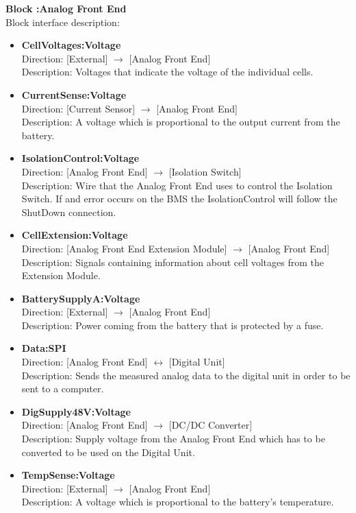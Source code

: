 \textbf{Block :Analog Front End}\\
Block interface description:
\begin{itemize}
	\item \textbf{CellVoltages:Voltage}\\
	Direction: [External] $\rightarrow$ [Analog Front End]\\
	Description: Voltages that indicate the voltage of the individual cells.
	\item \textbf{CurrentSense:Voltage}\\
	Direction: [Current Sensor] $\rightarrow$ [Analog Front End]\\
	Description: A voltage which is proportional to the output current from the battery.
	\item \textbf{IsolationControl:Voltage}\\
	Direction: [Analog Front End] $\rightarrow$ [Isolation Switch]\\
	Description: Wire that the Analog Front End uses to control the Isolation Switch. If and error occurs on the BMS the IsolationControl will follow the ShutDown connection.
	\item \textbf{CellExtension:Voltage}\\
	Direction: [Analog Front End Extension Module] $\rightarrow$ [Analog Front End]\\
	Description: Signals containing information about cell voltages from the Extension Module.
	\item \textbf{BatterySupplyA:Voltage}\\
	Direction: [External] $\rightarrow$ [Analog Front End]\\
	Description: Power coming from the battery that is protected by a fuse.
	\item \textbf{Data:SPI}\\
	Direction: [Analog Front End] $\leftrightarrow$ [Digital Unit]\\
	Description: Sends the measured analog data to the digital unit in order to be sent to a computer.
	\item \textbf{DigSupply48V:Voltage}\\
	Direction: [Analog Front End] $\rightarrow$ [DC/DC Converter]\\
	Description: Supply voltage from the Analog Front End which has to be converted to be used on the Digital Unit.
	\item \textbf{TempSense:Voltage}\\
	Direction: [External] $\rightarrow$ [Analog Front End]\\
	Description: A voltage which is proportional to the battery's temperature.
\end{itemize}

